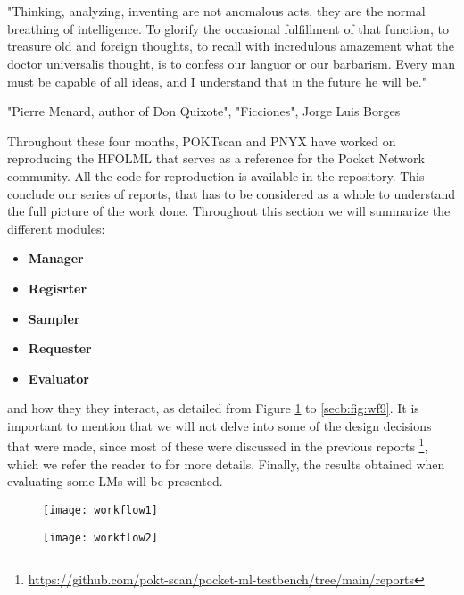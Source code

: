 \section{}\label{sec:b}
\setlength{\epigraphwidth}{\textwidth}
\epigraph{\small "Thinking, analyzing, inventing are not anomalous acts, they are the normal breathing of intelligence. To glorify the occasional fulfillment of that function, to treasure old and foreign thoughts, to recall with incredulous amazement what the doctor universalis thought, is to confess our languor or our barbarism. Every man must be capable of all ideas, and I understand that in the future he will be."}{"Pierre Menard, author of Don Quixote", "Ficciones", Jorge Luis Borges}


Throughout these four months, POKTscan and PNYX have worked on reproducing the \gls{HFOLML} \cite{noauthor_open_nodate} that serves as a reference for the Pocket Network community. 
All the code for reproduction is available in the repository. 
This conclude our series of reports, that has to be considered as a whole to understand the full picture of the work done. 
Throughout this section we will summarize the different modules:

\begin{itemize}[noitemsep]
    \item \textbf{Manager}
    \item \textbf{Regisrter}
    \item \textbf{Sampler}
    \item \textbf{Requester}
    \item \textbf{Evaluator}
\end{itemize}

and how they they interact, as detailed from Figure \ref{secb:fig:wf1} to \ref{secb:fig:wf9}. 
It is important to mention that we will not delve into some of the design decisions that were made, since most of these were discussed in the previous reports \footnote{\url{https://github.com/pokt-scan/pocket-ml-testbench/tree/main/reports}}, which we refer the reader to for more details. 
Finally, the results obtained when evaluating some \glspl{LM} will be presented.  

\begin{figure}[H]
    \centering        
    \texttt{[image: workflow1]}
    \caption{}
    \label{secb:fig:wf1}
\end{figure}

\begin{figure}[H]

    \centering        
    \texttt{[image: workflow2]}
    \caption{}
    \label{secb:fig:wf2}
\end{figure}

